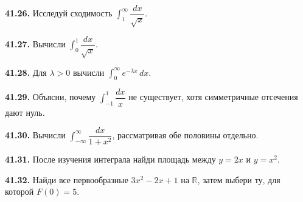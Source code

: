 \noindent\begin{minipage}[t]{\linewidth}\textbf{41.26.} Исследуй сходимость \(\int_1^\infty\dfrac{dx}{\sqrt x}\).\par\end{minipage}\par
\noindent\begin{minipage}[t]{\linewidth}\textbf{41.27.} Вычисли \(\int_0^1\dfrac{dx}{\sqrt x}\).\par\end{minipage}\par
\noindent\begin{minipage}[t]{\linewidth}\textbf{41.28.} Для \(\lambda>0\) вычисли \(\int_0^\infty e^{-\lambda x}\,dx\).\par\end{minipage}\par
\noindent\begin{minipage}[t]{\linewidth}\textbf{41.29.}\starmark{} Объясни, почему \(\int_{-1}^1\dfrac{dx}{x}\) не существует, хотя симметричные отсечения дают нуль.\par\end{minipage}\par
\noindent\begin{minipage}[t]{\linewidth}\textbf{41.30.} Вычисли \(\int_{-\infty}^{\infty}\dfrac{dx}{1+x^2}\), рассматривая обе половины отдельно.\par\end{minipage}\par
\noindent\begin{minipage}[t]{\linewidth}\textbf{41.31.} После изучения интеграла найди площадь между \(y=2x\) и \(y=x^2\).\par\end{minipage}\par
\noindent\begin{minipage}[t]{\linewidth}\textbf{41.32.} Найди все первообразные \(3x^2-2x+1\) на \(\mathbb R\), затем выбери ту, для которой \(F(0)=5\).\par\end{minipage}\par
\endgroup
